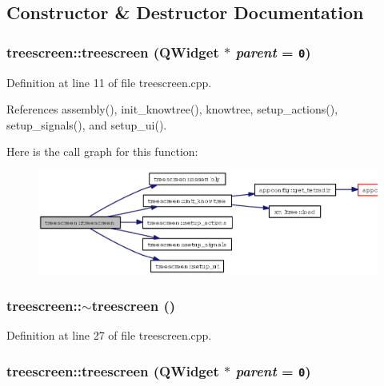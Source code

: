 \subsection{Constructor \& Destructor Documentation}
\subsubsection{\setlength{\rightskip}{0pt plus 5cm}treescreen::treescreen (QWidget $\ast$ {\em parent} = {\tt 0})}\label{classtreescreen_7c86707d7c256b918f528e2a89bc2a9b}




Definition at line 11 of file treescreen.cpp.

References assembly(), init\_\-knowtree(), knowtree, setup\_\-actions(), setup\_\-signals(), and setup\_\-ui().

Here is the call graph for this function:\begin{figure}[H]
\begin{center}
\leavevmode
\includegraphics[width=358pt]{classtreescreen_7c86707d7c256b918f528e2a89bc2a9b_cgraph}
\end{center}
\end{figure}
\subsubsection{\setlength{\rightskip}{0pt plus 5cm}treescreen::$\sim$treescreen ()\hspace{0.3cm}{\tt  [virtual]}}\label{classtreescreen_4e63676f90a8bb091bf5253f61467be3}




Definition at line 27 of file treescreen.cpp.
\subsubsection{\setlength{\rightskip}{0pt plus 5cm}treescreen::treescreen (QWidget $\ast$ {\em parent} = {\tt 0})}\label{classtreescreen_7c86707d7c256b918f528e2a89bc2a9b}


